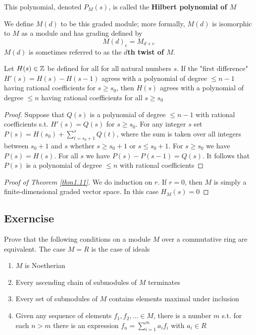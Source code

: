 \documentclass[11pt]{article}
\begin{document}
\begin{definition}[]
This polynomial, denoted \(P_M(s)\), is called the \textbf{Hilbert polynomial of \(M\)}
\end{definition}

We define \(M(d)\) to be this graded module; more formally, \(M(d)\) is
isomorphic to \(M\) as a module and has grading defined by
\begin{equation*}
M(d)_e=M_{d+e}
\end{equation*}
\(M(d)\) is sometimes referred to as the \textbf{\(d\)th twist of \(M\)}.

\begin{lemma}[]
Let \(H(s)\in\mathbb{Z}\) be defined for all for all natural numbers \(s\). If the
"first difference" \(H'(s)=H(s)-H(s-1)\) agrees with a polynomial of degree
\(\le n-1\) having rational coefficients for \(s\ge s_0\), then \(H(s)\)
agrees with a polynomial of degree \(\le n\) having rational coefficients for
all \(s\ge s_0\)
\end{lemma}

\begin{proof}
Suppose that \(Q(s)\) is a polynomial of degree \(\le n-1\) with rational
coefficients s.t. \(H'(s)=Q(s)\) for \(s\ge s_0\). For any integer \(s\) set
\(P(s)=H(s_0)+\sum_{t=s_0+1}^sQ(t)\), where the sum is taken over all
integers between \(s_0+1\) and \(s\) whether \(s\ge s_0+1\) or \(s\le
   s_0+1\).
For \(s\ge s_0\) we have \(P(s)=H(s)\). For all \(s\) we have
\(P(s)-P(s-1)=Q(s)\). It follows that \(P(s)\) is a polynomial of degree
\(\le n\) with rational coefficients
\end{proof}

\begin{proof}[Proof of Theorem \ref{thm1.11}]
We do induction on \(r\). If \(r=0\), then \(M\) is simply a
finite-dimensional graded vector space. In this case \(H_M(s)=0\)
\end{proof}
\subsection{Exerncise}
\label{sec:org8796bb0}
\begin{exercise}
\label{ex1.1}
Prove that the following conditions on a module \(M\) over a commutative ring
are equivalent. The case \(M=R\) is the case of ideals
\begin{enumerate}
\item \(M\) is Noetherian
\item Every ascending chain of submodules of \(M\) terminates
\item Every set of submodules of \(M\) contains elements maximal under inclusion
\item Given any sequence of elements \(f_1,f_2,\dots\in M\), there is a number
\(m\) s.t. for each \(n>m\) there is an expression
\(f_n=\sum_{i=1}^ma_if_i\) with \(a_i\in R\)
\end{enumerate}
\end{exercise}
\end{document}
